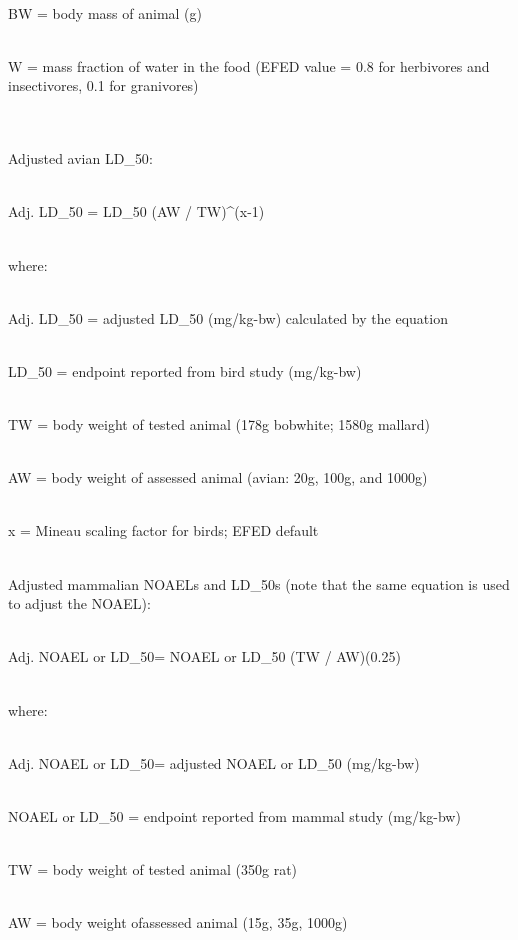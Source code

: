\\BW = body\; mass\; of \;animal (g)

\\W = mass \;fraction\; of\; water \;in\; the\; food\; (EFED\; value = 0.8 \;for \;herbivores\; and\; insectivores, 0.1 \;for \;granivores)




\\
\\Adjusted \;avian \;LD_{50}:

\\Adj. \; LD_{50} = LD_{50} (AW / TW)^{(x-1)}

\\where:

\\Adj. \; LD_{50} = adjusted  \;LD_{50} \; (mg/kg-bw)  \;calculated \; by \; the  \;equation

\\LD_{50} = endpoint\; reported\; from\; bird\; study \;(mg/kg-bw)

\\TW = body \;weight\; of \;tested\; animal (178g\; bobwhite; 1580g\; mallard)

\\AW = body\; weight\; of \;assessed\; animal (avian:\; 20g,\; 100g, \;and \;1000g)

\\x = Mineau\; scaling \;factor\; for\; birds; EFED\; default 

\\Adjusted\; mammalian\; NOAELs \;and \;LD_{50s} \;(note \;that \;the\; same equation\; is \;used\; to\; adjust \;the \;NOAEL):


\\Adj.\; NOAEL\; or \;LD_{50}= NOAEL \;or \;LD_{50} (TW / AW)(0.25)

\\where:

\\Adj.\;  NOAEL\; \; or\; LD_{50}= adjusted\; NOAEL \;or \;LD_{50} \;(mg/kg-bw)

\\NOAEL \;or \;LD_{50} = endpoint \;reported\; from \;mammal\; study\; (mg/kg-bw)

\\TW = body \;weight \;of \;tested\; animal\; (350g\; rat)

\\AW = body \;weight \;of\;assessed\; animal\; (15g, 35g, 1000g)

